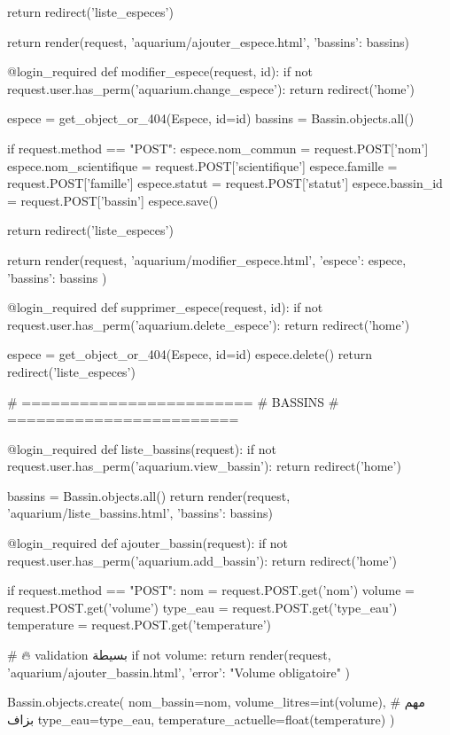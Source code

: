         return redirect('liste_especes')

    return render(request, 'aquarium/ajouter_espece.html', {'bassins': bassins})


@login_required
def modifier_espece(request, id):
    if not request.user.has_perm('aquarium.change_espece'):
        return redirect('home')

    espece = get_object_or_404(Espece, id=id)
    bassins = Bassin.objects.all()

    if request.method == "POST":
        espece.nom_commun = request.POST['nom']
        espece.nom_scientifique = request.POST['scientifique']
        espece.famille = request.POST['famille']
        espece.statut = request.POST['statut']
        espece.bassin_id = request.POST['bassin']
        espece.save()

        return redirect('liste_especes')

    return render(request, 'aquarium/modifier_espece.html', {
        'espece': espece,
        'bassins': bassins
    })


@login_required
def supprimer_espece(request, id):
    if not request.user.has_perm('aquarium.delete_espece'):
        return redirect('home')

    espece = get_object_or_404(Espece, id=id)
    espece.delete()
    return redirect('liste_especes')


# ========================
# BASSINS
# ========================

@login_required
def liste_bassins(request):
    if not request.user.has_perm('aquarium.view_bassin'):
        return redirect('home')

    bassins = Bassin.objects.all()
    return render(request, 'aquarium/liste_bassins.html', {'bassins': bassins})

@login_required
def ajouter_bassin(request):
    if not request.user.has_perm('aquarium.add_bassin'):
        return redirect('home')

    if request.method == "POST":
        nom = request.POST.get('nom')
        volume = request.POST.get('volume')
        type_eau = request.POST.get('type_eau')
        temperature = request.POST.get('temperature')

        # 🔥 validation بسيطة
        if not volume:
            return render(request, 'aquarium/ajouter_bassin.html', {
                'error': "Volume obligatoire"
            })

        Bassin.objects.create(
            nom_bassin=nom,
            volume_litres=int(volume),  # مهم بزاف
            type_eau=type_eau,
            temperature_actuelle=float(temperature)
        )

